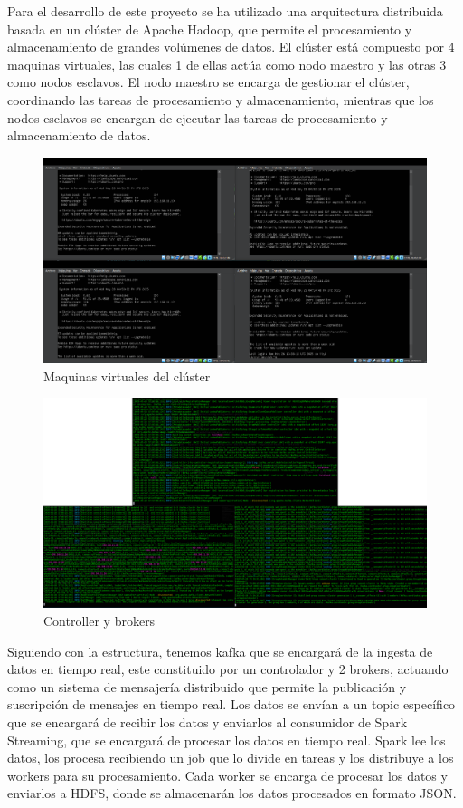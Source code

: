\documentclass[12pt]{article}
\begin{document}
Para el desarrollo de este proyecto se ha utilizado una arquitectura distribuida basada en un clúster de Apache Hadoop,
que permite el procesamiento y almacenamiento de grandes volúmenes de datos. El clúster está compuesto por 4 maquinas virtuales,
las cuales 1 de ellas actúa como nodo maestro y las otras 3 como nodos esclavos.
El nodo maestro se encarga de gestionar el clúster, coordinando las tareas de procesamiento y almacenamiento,
mientras que los nodos esclavos se encargan de ejecutar las tareas de procesamiento y almacenamiento de datos.

\begin{figure}[h!]
    \centering
    \includegraphics[width=.7\textwidth]{assets/proyecto/maquinas.PNG}
    \caption{Maquinas virtuales del clúster}
    \label{fig:my_label}
\end{figure}

\begin{figure}[h!]
    \centering
    \includegraphics[width=.7\textwidth]{assets/proyecto/cluster.png}
    \caption{Controller y brokers}
    \label{fig:my_label}
\end{figure}

\clearpage

Siguiendo con la estructura, tenemos kafka que se encargará de la ingesta de datos en tiempo real,
este constituido por un controlador y 2 brokers, actuando como un sistema de mensajería distribuido 
que permite la publicación y suscripción de mensajes en tiempo real.
Los datos se envían a un topic específico que se encargará de recibir los datos y enviarlos al consumidor de
Spark Streaming, que se encargará de procesar los datos en tiempo real.
Spark lee los datos, los procesa recibiendo un job que lo divide en tareas y los distribuye a los workers
para su procesamiento. Cada worker se encarga de procesar los datos y enviarlos a HDFS, donde se almacenarán
los datos procesados en formato JSON.
\end{document}
